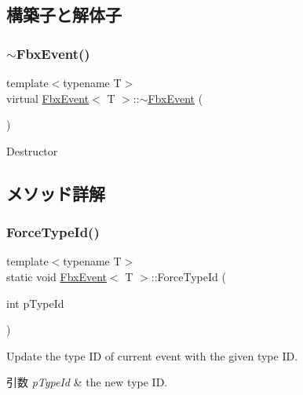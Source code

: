 \subsection{構築子と解体子}
\mbox{\label{class_fbx_event_a57f0d84cc53c4d29bcff0dceb091eed4}} 
\subsubsection{\texorpdfstring{$\sim$\+Fbx\+Event()}{~FbxEvent()}}
{\footnotesize\ttfamily template$<$typename T$>$ \\
virtual \hyperlink{class_fbx_event}{Fbx\+Event}$<$ T $>$\+::$\sim$\hyperlink{class_fbx_event}{Fbx\+Event} (\begin{DoxyParamCaption}{ }\end{DoxyParamCaption})\hspace{0.3cm}{\ttfamily [virtual]}}



Destructor 



\subsection{メソッド詳解}
\mbox{\label{class_fbx_event_a0e3fe581649a5917208561a03ad61295}} 
\subsubsection{\texorpdfstring{Force\+Type\+Id()}{ForceTypeId()}}
{\footnotesize\ttfamily template$<$typename T$>$ \\
static void \hyperlink{class_fbx_event}{Fbx\+Event}$<$ T $>$\+::Force\+Type\+Id (\begin{DoxyParamCaption}\item[{int}]{p\+Type\+Id }\end{DoxyParamCaption})\hspace{0.3cm}{\ttfamily [static]}}

Update the type ID of current event with the given type ID. 
\begin{DoxyParams}{引数}
{\em p\+Type\+Id} & the new type ID. \\
\hline
\end{DoxyParams}
\mbox{\label{class_fbx_event_a9f2329973ee8cb60860d004cc2823c70}} 
